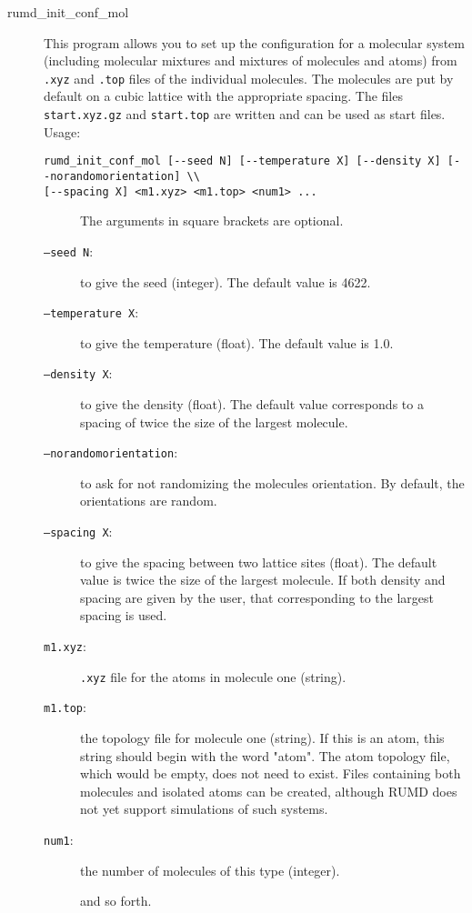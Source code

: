 \documentclass[a4paper]{article}
\begin{document}
\begin{description}
\item[rumd\_init\_conf\_mol]
  This program allows you to set up the configuration for a molecular
  system (including molecular mixtures and mixtures of molecules and atoms) from \texttt{.xyz} and
  \texttt{.top} files of the individual molecules. The molecules are put 
  by default on a cubic lattice with the appropriate spacing. The files
  \texttt{start.xyz.gz} and \texttt{start.top} are written and can be used as
  start files. Usage:
\begin{verbatim} 
rumd_init_conf_mol [--seed N] [--temperature X] [--density X] [--norandomorientation] \\
[--spacing X] <m1.xyz> <m1.top> <num1> ...
\end{verbatim}
  \begin{description}
  \item[] {The arguments in square brackets are optional.}
  \item[\texttt{--seed N}:] {to give the seed (integer). The default value is 4622.}
  \item[\texttt{--temperature X}:] {to give the temperature (float). The default value is 1.0.}
  \item[\texttt{--density X}:] {to give the density (float). The default value corresponds
  to a spacing of twice the size of the largest molecule.}
  \item[\texttt{--norandomorientation}:] {to ask for not randomizing the molecules orientation. By default,
  the orientations are random.}
  \item[\texttt{--spacing X}:] {to give the spacing between two lattice sites (float).
  The default value is twice the size of the largest molecule.
  If both density and spacing are given by the user,
  that corresponding to the largest spacing is used.}
  \item[\texttt{m1.xyz}:] {\texttt{.xyz} file for the atoms in molecule one (string).}
  \item[\texttt{m1.top}:] {the topology file for molecule one (string). If this is an atom, this string should begin with
  the word "atom". The atom topology file, which would be empty, does not need to exist. Files containing both molecules and isolated atoms can be created, although RUMD does not yet support simulations of such systems.}
  \item[\texttt{num1}:] {the number of molecules of this type (integer).}
  \item[] {and so forth.}

\end{description}
\end{description}
\end{document}
